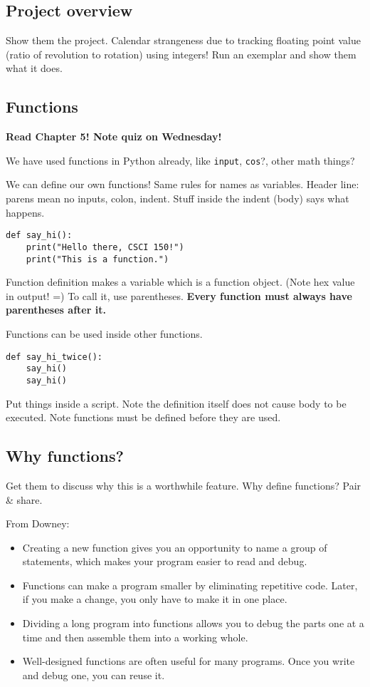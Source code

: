 \documentclass{article}
\begin{document}
\subsection*{Project overview}

Show them the project.  Calendar strangeness due to tracking floating
point value (ratio of revolution to rotation) using integers!  Run an
exemplar and show them what it does.

\subsection*{Functions}

\textbf{Read Chapter 5! Note quiz on Wednesday!}

We have used functions in Python already, like \verb|input|,
\verb|cos|?, other math things?

We can define our own functions!  Same rules for names as
variables. Header line: parens mean no inputs, colon, indent.  Stuff
inside the indent (body) says what happens.

\begin{verbatim}
def say_hi():
    print("Hello there, CSCI 150!")
    print("This is a function.")
\end{verbatim}

Function definition makes a variable which is a function object. (Note
hex value in output! =) To call it, use parentheses.  \textbf{Every
  function must always have parentheses after it.}

Functions can be used inside other functions.

\begin{verbatim}
def say_hi_twice():
    say_hi()
    say_hi()
\end{verbatim}

Put things inside a script.  Note the definition itself does not cause
body to be executed.  Note functions must be defined before they are
used.

\subsection*{Why functions?}

Get them to discuss why this is a worthwhile feature.  Why define
functions?  Pair \& share.

From Downey:

\begin{itemize}
\item Creating a new function gives you an opportunity to name a group
  of statements, which makes your program easier to read and debug.
\item  Functions can make a program smaller by eliminating repetitive code.
  Later, if you make a change, you only have to make it in one place.
\item Dividing a long program into
  functions allows you to debug the parts one at a time and then
  assemble them into a working whole.
\item Well-designed functions are often useful for many programs.
  Once you write and debug one, you can reuse it.
\end{itemize}
\end{document}
